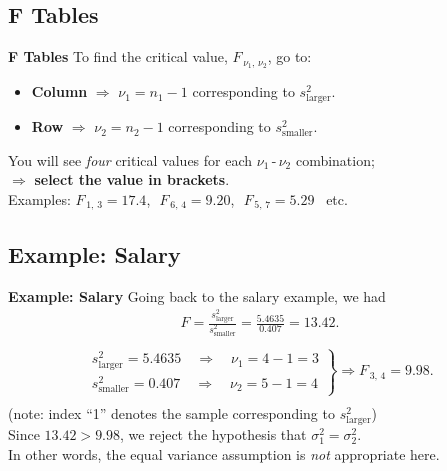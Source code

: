 \documentclass[compress]{beamer}        %
\makeatletter
\newcommand{\tcb}{\textcolor{beamer@blendedblue}}
\makeatother
\begin{document}
\subsection{F Tables}
\begin{frame}{\bf \tcb{F Tables}}
To find the critical value, $F_{\,\nu_1,\,\nu_2}$, go to:\\[0.2cm]
\begin{itemize}\itemsep0.6cm
\item {\bf Column} $\Rightarrow$ $\nu_1=n_1-1$ corresponding to $s^2_{\text{larger}}$.
\item {\bf Row} $\Rightarrow$ $\nu_2=n_2-1$ corresponding to $s^2_{\text{smaller}}$.\\[0.8cm]
\end{itemize}

You will see \emph{four} critical values for each $\nu_1$\,-\,$\nu_2$ combination;\\[0.1cm] $\Rightarrow$ {\bf select the value in brackets}.\\[0.8cm]

Examples: $F_{\,1,\,3}=17.4$,\,\, $F_{\,6,\,4}=9.20$,\,\, $F_{\,5,\,7}=5.29$ \, etc.


\end{frame}


\subsection{Example: Salary}
\begin{frame}{\bf \tcb{Example: Salary}}
Going back to the salary example, we had
\begin{align*}
F = \frac{s^2_{\text{larger}}}{s^2_{\text{smaller}}} = \frac{5.4635}{0.407} = 13.42.\\[-0.7cm]
\end{align*}
\begin{align*}\left.
\begin{array}{l}
s^2_{\text{larger}} = 5.4635 \quad \Rightarrow \quad \nu_1 = 4-1=3 \\[0.3cm]
s^2_{\text{smaller}} = 0.407 \quad \Rightarrow \quad \nu_2 = 5-1=4
\end{array}\right\} \Rightarrow F_{\,3,\,4}=9.98.\\[-0.7cm]
\end{align*}
{\footnotesize(note: index ``1'' denotes the sample corresponding to $s^2_{\text{larger}}$)}\\[0.6cm]

Since $13.42 > 9.98$, we reject the hypothesis that $\sigma_1^2 = \sigma_2^2$.\\[0.4cm]
In other words, the equal variance assumption is \emph{not} appropriate here.


\end{frame}
\end{document}
